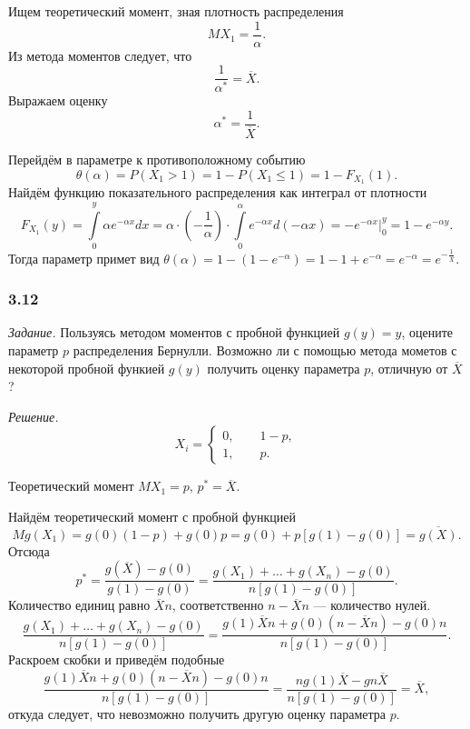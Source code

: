 Ищем теоретический момент, зная плотность распределения
$$MX_1 =
  \frac{1}{ \alpha }.$$
Из метода моментов следует, что
$$ \frac{1}{ \alpha^*} =
  \overline{X}.$$
Выражаем оценку
$$ \alpha^* =
  \frac{1}{ \overline{X}}.$$

Перейдём в параметре к противоположному событию
$$ \theta \left( \alpha \right) =
  P \left( X_1 > 1 \right) =
  1 - P \left( X_1 \leq 1 \right) =
  1 - F_{X_1} \left( 1 \right).$$
Найдём функцию показательного распределения как интеграл от плотности
$$F_{X_1} \left( y \right) =
  \int \limits_0^y \alpha e^{ - \alpha x} dx =
  \alpha \cdot \left( - \frac{1}{ \alpha } \right) \cdot
  \int \limits_0^{ \alpha } e^{- \alpha x} d \left( - \alpha x \right) =
  \left. -e^{- \alpha x} \right|_0^y =
  1 - e^{- \alpha y}.$$
Тогда параметр примет вид
$ \theta \left( \alpha \right) =
  1 - \left( 1 - e^{- \alpha } \right) =
  1 - 1 + e^{- \alpha } =
  e^{- \alpha } =
  e^{- \frac{1}{ \overline{X}}}.$

\subsubsection*{3.12}

\textit{Задание.}
Пользуясь методом моментов с пробной функцией $g \left( y \right) = y$,
оцените параметр $p$ распределения Бернулли.
Возможно ли с помощью метода мометов с некоторой
пробной функией $g \left( y \right) $ получить оценку параметра $p$, отличную от $ \overline{X}$?

\textit{Решение.}
$$X_i =
  \begin{cases}
    0, \qquad 1 - p, \\
    1, \qquad p.
  \end{cases}$$

Теоретический момент $MX_1 = p, \, p^* = \overline{X}$.

Найдём теоретический момент с пробной функцией
$$Mg \left( X_1 \right) =
  g \left( 0 \right) \left( 1 - p \right) + g \left( 0 \right) p =
  g \left( 0 \right) + p \left[ g \left( 1 \right) - g \left( 0 \right) \right] =
  \overline{g \left( X \right) }.$$
Отсюда
$$p^* =
  \frac{g \left( \overline{X} \right) - g \left( 0 \right) }{g \left( 1 \right) - g \left( 0 \right) }=
  \frac{g \left( X_1 \right) + \dotsc + g \left( X_n \right) - g \left( 0 \right) }{n \left[ g \left( 1 \right) - g \left( 0 \right) \right]}.$$
Количество единиц равно $ \overline{X} n$, соответственно $n - \overline{X} n$ --- количество нулей.
$$\frac{g \left( X_1 \right) + \dotsc + g \left( X_n \right) - g \left( 0 \right) }{n \left[ g \left( 1 \right) - g \left( 0 \right) \right]} =
  \frac{g \left( 1 \right) \overline{X} n + g \left( 0 \right) \left( n - \overline{X} n \right) - g \left( 0 \right) n}{n \left[ g \left( 1 \right) - g \left( 0 \right) \right] }.$$
Раскроем скобки и приведём подобные
$$ \frac{g \left( 1 \right) \overline{X} n + g \left( 0 \right) \left( n - \overline{X} n \right) - g \left( 0 \right) n}{n \left[ g \left( 1 \right) - g \left( 0 \right) \right] } =
  \frac{ng \left( 1 \right) \overline{X} - gn \overline{X}}{n \left[ g \left( 1 \right) - g \left( 0 \right) \right] } =
  \overline{X},$$
откуда следует, что невозможно получить другую оценку параметра $p$.
